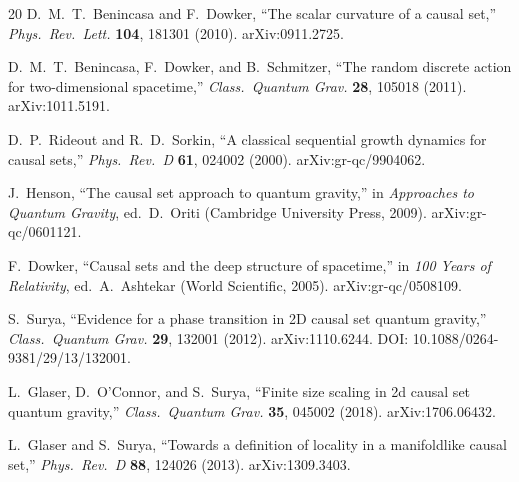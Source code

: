 \documentclass[12pt,a4paper]{article}
\begin{document}
\begin{thebibliography}{20}
D.~M.~T.~Benincasa and F.~Dowker,
``The scalar curvature of a causal set,''
\textit{Phys.\ Rev.\ Lett.} \textbf{104}, 181301 (2010).
arXiv:0911.2725.

D.~M.~T.~Benincasa, F.~Dowker, and B.~Schmitzer,
``The random discrete action for two-dimensional spacetime,''
\textit{Class.\ Quantum Grav.} \textbf{28}, 105018 (2011).
arXiv:1011.5191.

D.~P.~Rideout and R.~D.~Sorkin,
``A classical sequential growth dynamics for causal sets,''
\textit{Phys.\ Rev.\ D} \textbf{61}, 024002 (2000).
arXiv:gr-qc/9904062.

J.~Henson,
``The causal set approach to quantum gravity,''
in \textit{Approaches to Quantum Gravity}, ed.\ D.~Oriti
(Cambridge University Press, 2009). arXiv:gr-qc/0601121.

F.~Dowker,
``Causal sets and the deep structure of spacetime,''
in \textit{100 Years of Relativity}, ed.\ A.~Ashtekar
(World Scientific, 2005). arXiv:gr-qc/0508109.

S.~Surya,
``Evidence for a phase transition in 2D causal set quantum gravity,''
\textit{Class.\ Quantum Grav.} \textbf{29}, 132001 (2012).
arXiv:1110.6244.
DOI: 10.1088/0264-9381/29/13/132001.

L.~Glaser, D.~O'Connor, and S.~Surya,
``Finite size scaling in 2d causal set quantum gravity,''
\textit{Class.\ Quantum Grav.} \textbf{35}, 045002 (2018).
arXiv:1706.06432.

L.~Glaser and S.~Surya,
``Towards a definition of locality in a manifoldlike causal set,''
\textit{Phys.\ Rev.\ D} \textbf{88}, 124026 (2013).
arXiv:1309.3403.

\end{thebibliography}
\end{document}
